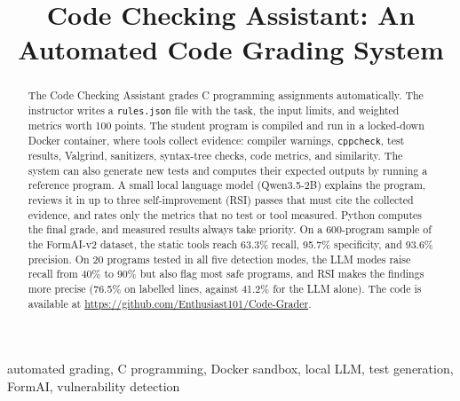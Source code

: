 \documentclass[conference]{IEEEtran}
\begin{document}
\title{Code Checking Assistant: An Automated Code Grading System}

\author{
\and
{}
\and
{}
\and
{}
}

\maketitle

\begin{abstract}
The Code Checking Assistant grades C programming assignments automatically. The
instructor writes a \texttt{rules.json} file with the task, the input limits, and
weighted metrics worth 100 points. The student program is compiled and run in a
locked-down Docker container, where tools collect evidence: compiler warnings,
\texttt{cppcheck}, test results, Valgrind, sanitizers, syntax-tree checks, code
metrics, and similarity. The system can also generate new tests and computes
their expected outputs by running a reference program. A small local language
model (Qwen3.5-2B) explains the program, reviews it in up to three
self-improvement (RSI) passes that must cite the collected evidence, and rates
only the metrics that no test or tool measured. Python computes the final grade,
and measured results always take priority. On a 600-program sample of the
FormAI-v2 dataset, the static tools reach 63.3\% recall, 95.7\% specificity, and
93.6\% precision. On 20 programs tested in all five detection modes, the LLM
modes raise recall from 40\% to 90\% but also flag most safe programs, and RSI
makes the findings more precise (76.5\% on labelled lines, against 41.2\% for
the LLM alone). The code is available at
\url{https://github.com/Enthusiast101/Code-Grader}.
\end{abstract}

\begin{IEEEkeywords}
automated grading, C programming, Docker sandbox, local LLM, test generation,
FormAI, vulnerability detection
\end{IEEEkeywords}
\end{document}
